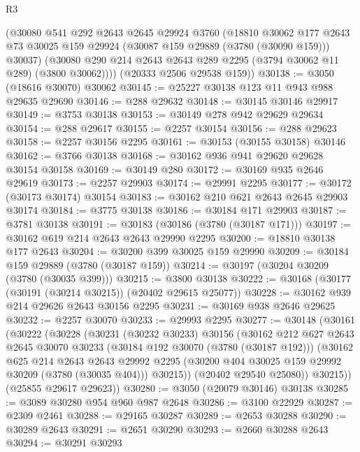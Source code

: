 \begin{lexlean}{R3}
\begin{coremodule}
        (@30080
          @541
          @292
          @2643
          @2645
          @29924
          @3760
          (@18810
            @30062
            @177
            @2643
            @73
            @30025
            @159
            @29924
            (@30087 @159 @29889 (@3780 (@30090 @159)))
            @30037)
          (@30080 @290 @214 @2643 @2643 @289 @2295 (@3794 @30062 @11 @289) (@3800 @30062))))
      (@20333 @2506 @29538 @159))
@30138 := @3050 (@18616 @30070) @30062
@30145 := @25227 @30138 @123 @11 @943 @988 @29635 @29690
@30146 := @288 @29632
@30148 := @30145 @30146 @29917
@30149 := @3753 @30138
@30153 := @30149 @278 @942 @29629 @29634
@30154 := @288 @29617
@30155 := @2257 @30154
@30156 := @288 @29623
@30158 := @2257 @30156 @2295
@30161 := @30153 (@30155 @30158) @30146
@30162 := @3766 @30138
@30168 := @30162 @936 @941 @29620 @29628 @30154 @30158
@30169 := @30149 @280
@30172 := @30169 @935 @2646 @29619
@30173 := @2257 @29903
@30174 := @29991 @2295
@30177 := @30172 (@30173 @30174) @30154
@30183 := @30162 @210 @621 @2643 @2645 @29903 @30174
@30184 := @3775 @30138
@30186 := @30184 @171 @29903
@30187 := @3781 @30138
@30191 := @30183 (@30186 (@3780 (@30187 @171)))
@30197 := @30162 @619 @214 @2643 @2643 @29990 @2295
@30200 := @18810 @30138 @177 @2643
@30204 := @30200 @399 @30025 @159 @29990
@30209 := @30184 @159 @29889 (@3780 (@30187 @159))
@30214 := @30197 (@30204 @30209 (@3780 (@30035 @399)))
@30215 := @3800 @30138
@30222 := @30168 (@30177 (@30191 (@30214 @30215)) (@20402 @29615 @25077))
@30228 := @30162 @939 @214 @29626 @2643 @30156 @2295
@30231 := @30169 @938 @2646 @29625
@30232 := @2257 @30070
@30233 := @29993 @2295
@30277 := @30148
    (@30161
      (@30222
        (@30228
          (@30231
            (@30232 @30233)
            @30156
            (@30162
              @212
              @627
              @2643
              @2645
              @30070
              @30233
              (@30184 @192 @30070 (@3780 (@30187 @192)))
              (@30162
                @625
                @214
                @2643
                @2643
                @29992
                @2295
                (@30200 @404 @30025 @159 @29992 @30209 (@3780 (@30035 @404)))
                @30215))
            (@20402 @29540 @25080))
          @30215))
      (@25855 @29617 @29623))
@30280 := @3050 (@20079 @30146) @30138
@30285 := @3089 @30280 @954 @960 @987 @2648
@30286 := @3100 @22929
@30287 := @2309 @2461
@30288 := @29165 @30287
@30289 := @2653 @30288
@30290 := @30289 @2643
@30291 := @2651 @30290
@30293 := @2660 @30288 @2643
@30294 := @30291 @30293

\end{coremodule}
\end{lexlean}
